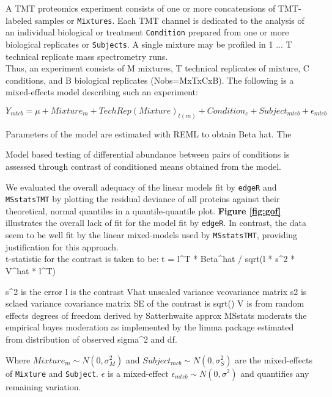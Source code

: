 \documentclass[12pt]{article}
\begin{document}
A TMT proteomics experiment consists of one or more concatensions of TMT-labeled
samples or \texttt{Mixtures}. Each TMT channel is dedicated to the analysis of an 
individual biological or treatment \texttt{Condition} prepared from one
or more biological replicates or \texttt{Subjects}. A single mixture may be 
profiled in 1 ... T technical replicate mass spectrometry runs.  \\

Thus, an experiment consists of M mixtures, T technical replicates of mixture, 
C conditions, and B biological replicates (Nobs=MxTxCxB). The following is 
a mixed-effects model describing such an experiment:

\begin{equation}
	Y_{mtcb} = \mu + Mixture_m + TechRep(Mixture)_{t(m)} + Condition_c + 
	Subject_{mtcb} + \epsilon_{mtcb}
\end{equation}

Parameters of the model are estimated with REML to obtain Beta hat. The

Model based testing of differential abundance between pairs of conditions
is assessed through contrast of conditioned means obtained from the model.

We evaluated the overall adequacy of the linear models 
fit by \texttt{edgeR} and \texttt{MSstatsTMT} by plotting the residual deviance 
of all proteins against their theoretical, normal quantiles in a 
quantile-quantile plot. \textbf{Figure \ref{fig:gof}} illustrates the overall 
lack of fit for the model fit by \texttt{edgeR}. In contrast, the data seem to
be well fit by the linear mixed-models used by \texttt{MSstatsTMT}, providing
justification for this approach. \\

t-statistic for the contrast is taken to be:
t = l^T * Beta^hat / sqrt(l * s^2 * V^hat * l^T)

s^2 is  the error
l is the contrast
Vhat unscaled variance vcovariance matrix
s2 is sclaed variance covariance matrix
SE of the contrast is sqrt()
V is from random effects
degrees of freedom derived by Satterhwaite approx 
MSstats moderats the empirical bayes moderation as implemented by the limma
package estimated from distribution of observed sigma^2 and df.


Where \(Mixture_m \sim N(0,\sigma^2_M)\) and 
\(Subject_{mcb} \sim N(0,\sigma^2_S)\) are the mixed-effects of \texttt{Mixture}
and \texttt{Subject}.
$\epsilon$ is a mixed-effect \(\epsilon_{mtcb} \sim N(0,\sigma^2)\) and
quantifies any remaining variation.
\end{document}
